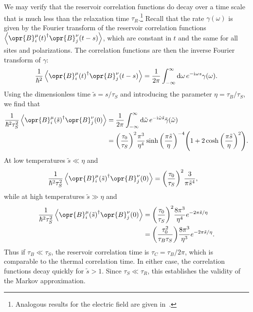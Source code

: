 \documentclass[../thesis.tex]{subfiles}
\begin{document}
We may verify that the reservoir correlation functions do decay over a time
scale that is much less than the relaxation time $\tau_R$.\footnote{%
  Analogous results for the electric field are given in~\cite[p.~574]{opensys}.
}
Recall that the rate $\gamma(\omega)$ is given by the Fourier transform of the
reservoir correlation functions
$\ev{\opr{B}_i^\mu{(t)}^\dag\opr{B}_j^\nu(t-s)}$, which are constant in $t$ and
the same for all sites and polarizations. The correlation functions are then the
inverse Fourier transform of $\gamma$:
\begin{equation}
  \frac{1}{\hbar^2}\ev{\opr{B}_i^\mu{(t)}^\dag\opr{B}_j^\nu(t-s)}
  = \frac{1}{2\pi}\int_{-\infty}^\infty \dd{\omega} e^{-\im\omega s}
  \gamma(\omega).
\end{equation}
Using the dimensionless time $\tilde{s} = s / \tau_S$ and introducing the
parameter $\eta = \tau_B / \tau_S$, we find that
\begin{align}
  \frac{1}{\hbar^2 \tau_S^2}\ev{\opr{B}_i^\mu{(\tilde{s})}^\dag\opr{B}_j^\nu(0)}
  &= \frac{1}{2\pi}\int_{-\infty}^\infty \dd{\tilde{\omega}}
  e^{-\im\tilde{\omega} \tilde{s}}
  \tilde{\gamma}(\tilde{\omega}) \\
  &= {\qty(\frac{\tau_0}{\tau_S})}^2 \frac{\pi^3}{\eta^4}
  \sinh{\qty(\frac{\pi \tilde{s}}{\eta})}^{-4} \qty(%
  1 + 2\cosh{\qty(\frac{\pi\tilde{s}}{\eta})}^2
  ).
\end{align}
At low temperatures $\tilde{s} \ll \eta$ and
\begin{align}
  \frac{1}{\hbar^2 \tau_S^2}\ev{\opr{B}_i^\mu{(\tilde{s})}^\dag\opr{B}_j^\nu(0)}
  &= {\qty(\frac{\tau_0}{\tau_S})}^2 \frac{3}{\pi \tilde{s}^4},
\end{align}
while at high temperatures $\tilde{s} \gg \eta$ and
\begin{align}
  \frac{1}{\hbar^2 \tau_S^2}\ev{\opr{B}_i^\mu{(\tilde{s})}^\dag\opr{B}_j^\nu(0)}
  &= {\qty(\frac{\tau_0}{\tau_S})}^2 \frac{8\pi^3}{\eta^4}
  e^{-2\pi\tilde{s} / \eta} \\
  &= \qty(\frac{\tau_0^2}{\tau_B \tau_S}) \frac{8\pi^3}{\eta^3}
  e^{-2\pi\tilde{s} / \eta}.
\end{align}
Thus if $\tau_B \ll \tau_S$, the reservoir correlation time is $\tau_C = \tau_B
/ 2\pi$, which is comparable to the thermal correlation time. In either case,
the correlation functions decay quickly for $\tilde{s} > 1$. Since $\tau_S \ll
\tau_R$, this establishes the validity of the Markov approximation.
\end{document}
